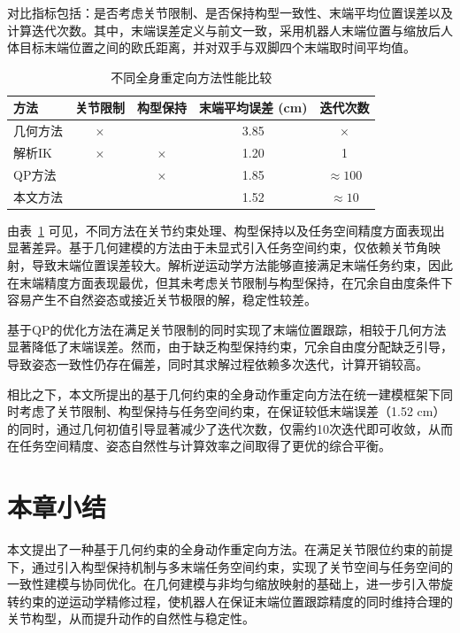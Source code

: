 对比指标包括：是否考虑关节限制、是否保持构型一致性、末端平均位置误差以及计算迭代次数。其中，末端误差定义与前文一致，采用机器人末端位置与缩放后人体目标末端位置之间的欧氏距离，并对双手与双脚四个末端取时间平均值。

\begin{table}[ht]
	\centering
	\caption{不同全身重定向方法性能比较}
	\begin{tabular}{lcccc}
		\toprule
		方法 & 关节限制 & 构型保持 & 末端平均误差 (cm) & 迭代次数 \\
		\midrule
		几何方法 & $\times$ & \checkmark & 3.85 & $\times$ \\
		解析IK & $\times$ & $\times$ & 1.20 & 1 \\
		QP方法 & \checkmark & $\times$ & 1.85 & $\approx100$ \\
		本文方法 & \checkmark & \checkmark & 1.52 & $\approx10$ \\
		\bottomrule
	\end{tabular}
	\label{tab_ablation}
\end{table}

由表~\ref{tab_ablation} 可见，不同方法在关节约束处理、构型保持以及任务空间精度方面表现出显著差异。基于几何建模的方法由于未显式引入任务空间约束，仅依赖关节角映射，导致末端位置误差较大。解析逆运动学方法能够直接满足末端任务约束，因此在末端精度方面表现最优，但其未考虑关节限制与构型保持，在冗余自由度条件下容易产生不自然姿态或接近关节极限的解，稳定性较差。

基于QP的优化方法在满足关节限制的同时实现了末端位置跟踪，相较于几何方法显著降低了末端误差。然而，由于缺乏构型保持约束，冗余自由度分配缺乏引导，导致姿态一致性仍存在偏差，同时其求解过程依赖多次迭代，计算开销较高。

相比之下，本文所提出的基于几何约束的全身动作重定向方法在统一建模框架下同时考虑了关节限制、构型保持与任务空间约束，在保证较低末端误差（1.52 cm）的同时，通过几何初值引导显著减少了迭代次数，仅需约10次迭代即可收敛，从而在任务空间精度、姿态自然性与计算效率之间取得了更优的综合平衡。




\section{本章小结}

本文提出了一种基于几何约束的全身动作重定向方法。在满足关节限位约束的前提下，通过引入构型保持机制与多末端任务空间约束，实现了关节空间与任务空间的一致性建模与协同优化。在几何建模与非均匀缩放映射的基础上，进一步引入带旋转约束的逆运动学精修过程，使机器人在保证末端位置跟踪精度的同时维持合理的关节构型，从而提升动作的自然性与稳定性。

